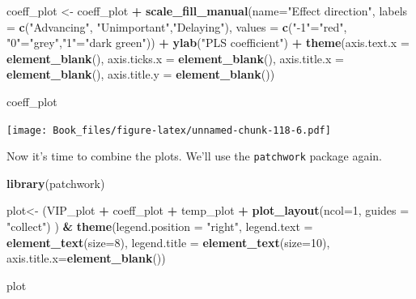 \documentclass[
]{book}
\newenvironment{Shaded}{\begin{snugshade}}{\end{snugshade}}
\newcommand{\DataTypeTok}[1]{\textcolor[rgb]{0.13,0.29,0.53}{#1}}
\newcommand{\DecValTok}[1]{\textcolor[rgb]{0.00,0.00,0.81}{#1}}
\newcommand{\KeywordTok}[1]{\textcolor[rgb]{0.13,0.29,0.53}{\textbf{#1}}}
\newcommand{\NormalTok}[1]{#1}
\newcommand{\OperatorTok}[1]{\textcolor[rgb]{0.81,0.36,0.00}{\textbf{#1}}}
\newcommand{\StringTok}[1]{\textcolor[rgb]{0.31,0.60,0.02}{#1}}
\begin{document}
\begin{Shaded}
\begin{Highlighting}[]
\NormalTok{coeff_plot <-}\StringTok{ }\NormalTok{coeff_plot }\OperatorTok{+}\StringTok{  }\KeywordTok{scale_fill_manual}\NormalTok{(}\DataTypeTok{name=}\StringTok{"Effect direction"}\NormalTok{, }
                    \DataTypeTok{labels =} \KeywordTok{c}\NormalTok{(}\StringTok{"Advancing"}\NormalTok{, }\StringTok{"Unimportant"}\NormalTok{,}\StringTok{"Delaying"}\NormalTok{), }
                    \DataTypeTok{values =} \KeywordTok{c}\NormalTok{(}\StringTok{"-1"}\NormalTok{=}\StringTok{"red"}\NormalTok{, }\StringTok{"0"}\NormalTok{=}\StringTok{"grey"}\NormalTok{,}\StringTok{"1"}\NormalTok{=}\StringTok{"dark green"}\NormalTok{)) }\OperatorTok{+}
\StringTok{  }\KeywordTok{ylab}\NormalTok{(}\StringTok{"PLS coefficient"}\NormalTok{) }\OperatorTok{+}
\StringTok{  }\KeywordTok{theme}\NormalTok{(}\DataTypeTok{axis.text.x =} \KeywordTok{element_blank}\NormalTok{(),}
        \DataTypeTok{axis.ticks.x =} \KeywordTok{element_blank}\NormalTok{(),}
        \DataTypeTok{axis.title.x =} \KeywordTok{element_blank}\NormalTok{(),}
        \DataTypeTok{axis.title.y =} \KeywordTok{element_blank}\NormalTok{())}

\NormalTok{coeff_plot}
\end{Highlighting}
\end{Shaded}

\texttt{[image: Book\_files/figure-latex/unnamed-chunk-118-6.pdf]}

Now it's time to combine the plots. We'll use the \texttt{patchwork} package again.

\begin{Shaded}
\begin{Highlighting}[]
\KeywordTok{library}\NormalTok{(patchwork)}

\NormalTok{plot<-}\StringTok{ }\NormalTok{(VIP_plot }\OperatorTok{+}
\StringTok{          }\NormalTok{coeff_plot }\OperatorTok{+}
\StringTok{          }\NormalTok{temp_plot }\OperatorTok{+}
\StringTok{          }\KeywordTok{plot_layout}\NormalTok{(}\DataTypeTok{ncol=}\DecValTok{1}\NormalTok{,}
            \DataTypeTok{guides =} \StringTok{"collect"}\NormalTok{)}
\NormalTok{        ) }\OperatorTok{&}\StringTok{ }\KeywordTok{theme}\NormalTok{(}\DataTypeTok{legend.position =} \StringTok{"right"}\NormalTok{,}
                  \DataTypeTok{legend.text =} \KeywordTok{element_text}\NormalTok{(}\DataTypeTok{size=}\DecValTok{8}\NormalTok{),}
                  \DataTypeTok{legend.title =} \KeywordTok{element_text}\NormalTok{(}\DataTypeTok{size=}\DecValTok{10}\NormalTok{),}
                  \DataTypeTok{axis.title.x=}\KeywordTok{element_blank}\NormalTok{())}

\NormalTok{plot}
\end{Highlighting}
\end{Shaded}
\end{document}
